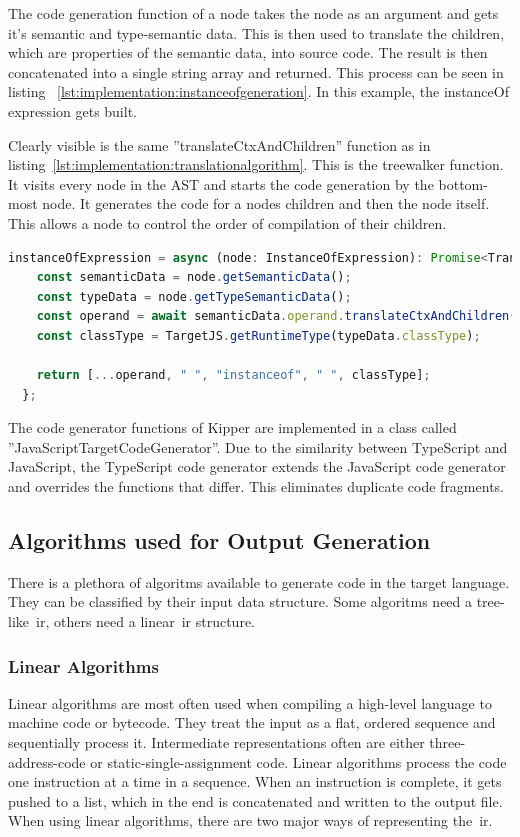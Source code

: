 The code generation function of a node takes the node as an argument and gets it's semantic and type-semantic data. This is then used to translate the children, which are properties of the semantic data, into source code. The result is then concatenated into a single string array and returned. This process can be seen in listing ~\ref{lst:implementation:instanceofgeneration}. In this example, the instanceOf expression gets built.

Clearly visible is the same ''translateCtxAndChildren'' function as in listing~\ref{lst:implementation:translationalgorithm}. This is the treewalker function. It visits every node in the AST and starts the code generation by the bottom-most node. It generates the code for a nodes children and then the node itself. This allows a node to control the order of compilation of their children.

\begin{lstlisting}[language=TypeScript,caption=The code generation function of a instanceOf expression,label=lst:implementation:instanceofgeneration]
instanceOfExpression = async (node: InstanceOfExpression): Promise<TranslatedExpression> => {
	const semanticData = node.getSemanticData();
	const typeData = node.getTypeSemanticData();
	const operand = await semanticData.operand.translateCtxAndChildren();
	const classType = TargetJS.getRuntimeType(typeData.classType);

    return [...operand, " ", "instanceof", " ", classType];
  };
\end{lstlisting}

The code generator functions of Kipper are implemented in a class called ''JavaScriptTargetCodeGenerator''. Due to the similarity between TypeScript and JavaScript, the TypeScript code generator extends the JavaScript code generator and overrides the functions that differ. This eliminates duplicate code fragments.

\subsection{Algorithms used for Output Generation}
There is a plethora of algoritms available to generate code in the target language. They can be classified by their input data structure. Some algoritms need a tree-like~\acrshort{ir}, others need a linear~\acrshort{ir} structure.

\subsubsection{Linear Algorithms}
Linear algorithms are most often used when compiling a high-level language to machine code or bytecode. They treat the input as a flat, ordered sequence and sequentially process it. Intermediate representations often are either three-address-code or static-single-assignment code. Linear algorithms process the code one instruction at a time in a sequence. When an instruction is complete, it gets pushed to a list, which in the end is concatenated and written to the output file. When using linear algorithms, there are two major ways of representing the~\acrshort{ir}.


